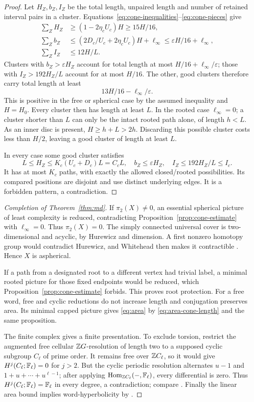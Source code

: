 \begin{proof}
Let $H_Z,b_Z,I_Z$ be the total length, unpaired length and number of retained interval pairs in a cluster. Equations~\eqref{eq:cone-inequalities}--\eqref{eq:cone-pieces} give
\begin{align*}
 \sum_ZH_Z&\ge(1-2\eta_cU_c)H\ge15H/16,\\
 \sum_Zb_Z&\le(2D_c/U_c+2\eta_cU_c)H+\ell_\infty
 \le\varepsilon H/16+\ell_\infty,\\
 \sum_ZI_Z&\le12H/L.
\end{align*}
Clusters with $b_Z>\varepsilon H_Z$ account for total length at most $H/16+\ell_\infty/\varepsilon$; those with $I_Z>192H_Z/L$ account for at most $H/16$. The other, good clusters therefore carry total length at least
\[
 13H/16-\ell_\infty/\varepsilon.
\]
This is positive in the free or spherical case by the assumed inequality and $H=H_0$. Every cluster then has length at least $L$. In the rooted case $\ell_\infty=0$; a cluster shorter than $L$ can only be the intact rooted path alone, of length $h<L$. As an inner disc is present, $H\ge h+L>2h$. Discarding this possible cluster costs less than $H/2$, leaving a good cluster of length at least $L$.

In every case some good cluster satisfies
\[
 L\le H_Z\le K_c(U_c+D_c)L=C_cL,
 \quad b_Z\le\varepsilon H_Z,
 \quad I_Z\le192H_Z/L\le I_c.
\]
It has at most $K_c$ paths, with exactly the allowed closed/rooted possibilities. Its compared positions are disjoint and use distinct underlying edges. It is a forbidden pattern, a contradiction.
\end{proof}

\begin{proof}[Completion of Theorem~\ref{thm:md}]
If $\pi_2(X)\ne0$, an essential spherical picture of least complexity is reduced, contradicting Proposition~\ref{prop:cone-estimate} with $\ell_\infty=0$. Thus $\pi_2(X)=0$. The simply connected universal cover is two-dimensional and acyclic, by Hurewicz and dimension. A first nonzero homotopy group would contradict Hurewicz, and Whitehead then makes it contractible \cite[Theorems~4.32 and~4.5]{Hat02}. Hence $X$ is aspherical.

If a path from a designated root to a different vertex had trivial label, a minimal rooted picture for those fixed endpoints would be reduced, which Proposition~\ref{prop:cone-estimate} forbids. This proves root protection. For a free word, free and cyclic reductions do not increase length and conjugation preserves area. Its minimal capped picture gives \eqref{eq:area} by \eqref{eq:area-cone-length} and the same proposition.

The finite complex gives a finite presentation. To exclude torsion, restrict the augmented free cellular $\mathbb Z G$-resolution of length two to a supposed cyclic subgroup $C_\ell$ of prime order. It remains free over $\mathbb Z C_\ell$, so it would give $H^j(C_\ell;\mathbb F_\ell)=0$ for $j>2$. But the cyclic periodic resolution alternates $u-1$ and $1+u+\cdots+u^{\ell-1}$; after applying $\operatorname{Hom}_{\mathbb Z C_\ell}(-,\mathbb F_\ell)$, every differential is zero. Thus $H^j(C_\ell;\mathbb F_\ell)=\mathbb F_\ell$ in every degree, a contradiction; compare \cite[Chapter~VIII]{Bro82}. Finally the linear area bound implies word-hyperbolicity by \cite[Theorem~III.H.2.9]{BH99}.
\end{proof}
